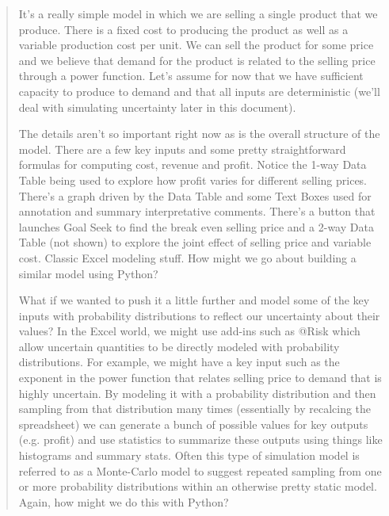 \documentclass[ited,blindrev]{informs3}              %
\begin{document}
\begin{tcolorbox}
\begin{quotation}
\textsf{	
	It's a really simple model in which we are selling a single product that we produce. There is a fixed cost to producing the product as well as a variable production cost per unit. We can sell the product for some price and we believe that demand for the product is related to the selling price through a power function. Let's assume for now that we have sufficient capacity to produce to demand and that all inputs are deterministic (we'll deal with simulating uncertainty later in this document).}
	
	\textsf{The details aren't so important right now as is the overall structure of the model. There are a few key inputs and some pretty straightforward formulas for computing cost, revenue and profit. Notice the 1-way Data Table being used to explore how profit varies for different selling prices. There's a graph driven by the Data Table and some Text Boxes used for annotation and summary interpretative comments. There's a button that launches Goal Seek to find the break even selling price and a 2-way Data Table (not shown) to explore the joint effect of selling price and variable cost. Classic Excel modeling stuff. How might we go about building a similar model using Python? } 
	
	\textsf{What if we wanted to push it a little further and model some of the key inputs with probability distributions to reflect our uncertainty about their values? In the Excel world, we might use add-ins such as @Risk which allow uncertain quantities to be directly modeled with probability distributions. For example, we might have a key input such as the exponent in the power function that relates selling price to demand that is highly uncertain. By modeling it with a probability distribution and then sampling from that distribution many times (essentially by recalcing the spreadsheet) we can generate a bunch of possible values for key outputs (e.g. profit) and use statistics to summarize these outputs using things like histograms and summary stats. Often this type of simulation model is referred to as a Monte-Carlo model to suggest repeated sampling from one or more probability distributions within an otherwise pretty static model. Again, how might we do this with Python?}
\end{quotation}
\end{tcolorbox}
\end{document}
